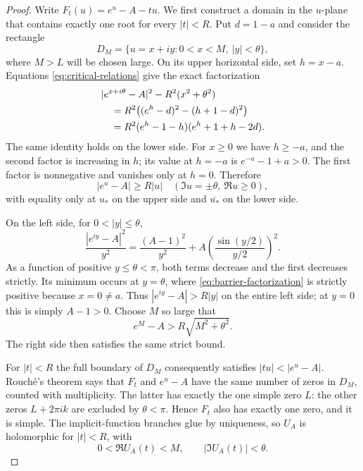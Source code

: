 \begin{proof}
Write $F_t(u)=e^u-A-tu$.  We first construct a domain in the $u$-plane
that contains exactly one root for every $|t|<R$.  Put $d=1-a$ and
consider the rectangle
\[
 D_M=\{u=x+iy:0<x<M,\ |y|<\theta\},
\]
where $M>L$ will be chosen large.  On its upper horizontal side, set
$h=x-a$.  Equations \eqref{eq:critical-relations} give the exact
factorization
\begin{align}
 &|e^{x+i\theta}-A|^2-R^2(x^2+\theta^2)\notag\\
 &\quad=R^2\bigl((e^h-d)^2-(h+1-d)^2\bigr)\notag\\
 &\quad=R^2(e^h-1-h)(e^h+1+h-2d).
                         \label{eq:barrier-factorization}
\end{align}
The same identity holds on the lower side.  For $x\geq0$ we have
$h\geq-a$, and the second factor is increasing in $h$; its value at
$h=-a$ is $e^{-a}-1+a>0$.  The first factor is nonnegative and vanishes
only at $h=0$.  Therefore
\begin{equation}\label{eq:horizontal-bound}
 |e^u-A|\geq R|u|\quad(\Im u=\pm\theta,\ \Re u\geq0),
\end{equation}
with equality only at $u_*$ on the upper side and $\overline{u_*}$ on
the lower side.

On the left side, for $0<|y|\leq\theta$,
\begin{equation}\label{eq:vertical-bound-formula}
 \frac{|e^{iy}-A|^2}{y^2}
   =\frac{(A-1)^2}{y^2}
      +A\left(\frac{\sin(y/2)}{y/2}\right)^2.
\end{equation}
As a function of positive $y\leq\theta<\pi$, both terms decrease and
the first decreases strictly.  Its minimum occurs at $y=\theta$,
where \eqref{eq:barrier-factorization} is strictly positive because
$x=0\neq a$.  Thus $|e^{iy}-A|>R|y|$ on the entire left side; at
$y=0$ this is simply $A-1>0$.  Choose $M$ so large that
\[
 e^M-A>R\sqrt{M^2+\theta^2}.
\]
The right side then satisfies the same strict bound.

For $|t|<R$ the full boundary of $D_M$ consequently satisfies
$|tu|<|e^u-A|$.  Rouch\'e's theorem says that $F_t$ and $e^u-A$ have
the same number of zeros in $D_M$, counted with multiplicity.  The
latter has exactly the one simple zero $L$: the other zeros
$L+2\pi ik$ are excluded by $\theta<\pi$.  Hence $F_t$ also has exactly
one zero, and it is simple.  The implicit-function branches glue by
uniqueness, so $U_A$ is holomorphic for $|t|<R$, with
\begin{equation}\label{eq:root-strip}
 0<\Re U_A(t)<M,\qquad |\Im U_A(t)|<\theta.
\end{equation}


\end{proof}
